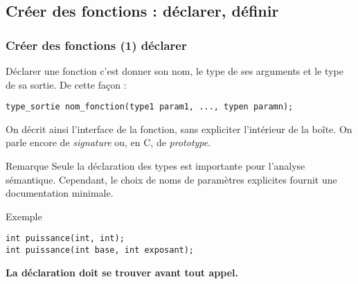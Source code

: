 \documentclass[xcolor=pdftex,svgnames,table]{beamer}
\begin{document}
\subsection{Créer des fonctions : déclarer, définir}
\begin{frame}[fragile]
  \frametitle{Créer des fonctions (1)  déclarer}
Déclarer une fonction c'est donner son nom, le type de ses arguments et
le type de sa sortie. De cette façon :
\begin{lstlisting}[basicstyle=\ttfamily\scriptsize] 
type_sortie nom_fonction(type1 param1, ..., typen paramn);
\end{lstlisting}
\pause On décrit ainsi l'interface de la fonction, sans expliciter
l'intérieur de la boîte. On parle encore de \emph{signature} 
  ou, en C, de \emph{prototype}.
\begin{block}{Remarque} 
  Seule la déclaration des types est importante pour
  l'analyse sémantique. Cependant, le choix de noms de paramètres
  explicites fournit une documentation minimale. 
\end{block}


\pause
\begin{block}{Exemple}
  
\begin{lstlisting}[basicstyle=\ttfamily\small] 
int puissance(int, int); 
int puissance(int base, int exposant);
\end{lstlisting}
\end{block}
\pause
\textbf{La déclaration doit se trouver avant tout appel.}
\end{frame}
\end{document}
